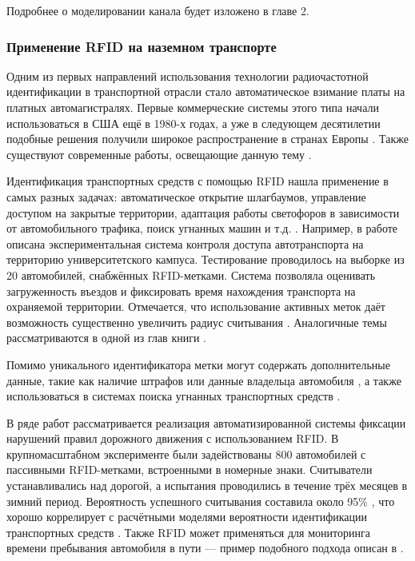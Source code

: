 \documentclass[12pt]{article}
\theoremstyle{definition}
\begin{document}
Подробнее о моделировании канала будет изложено в главе 2.

\subsubsection{Применение RFID на наземном транспорте}\label{sec:vehicles}

Одним из первых направлений использования технологии радиочастотной идентификации в транспортной отрасли стало автоматическое взимание платы на платных автомагистралях. Первые коммерческие системы этого типа начали использоваться в США ещё в 1980-х годах, а уже в следующем десятилетии подобные решения получили широкое распространение в странах Европы \cite{Blythe1999, J.2005}. Также существуют современные работы, освещающие данную тему \cite{Mazumder2025}.

Идентификация транспортных средств с помощью RFID нашла применение в самых разных задачах: автоматическое открытие шлагбаумов, управление доступом на закрытые территории, адаптация работы светофоров в зависимости от автомобильного трафика, поиск угнанных машин и т.д. \cite{Tseng2007, Bhavke2017, Rajeshwari2015, Balbin2017}. Например, в работе \cite{Pedraza2018} описана экспериментальная система контроля доступа автотранспорта на территорию университетского кампуса. Тестирование проводилось на выборке из 20 автомобилей, снабжённых RFID-метками. Система позволяла оценивать загруженность въездов и фиксировать время нахождения транспорта на охраняемой территории. Отмечается, что использование активных меток даёт возможность существенно увеличить радиус считывания \cite{Khan2011}. Аналогичные темы рассматриваются в одной из глав книги \cite{Ibrahim2025}.

Помимо уникального идентификатора метки могут содержать дополнительные данные, такие как наличие штрафов или данные владельца автомобиля \cite{MenesesGonzalez2011, Lonkar2018}, а также использоваться в системах поиска угнанных транспортных средств \cite{Balbin2017}.

В ряде работ \cite{Vishn2012, Vishn2012_3, Vishn2013} рассматривается реализация автоматизированной системы фиксации нарушений правил дорожного движения с использованием RFID. В крупномасштабном эксперименте были задействованы 800 автомобилей с пассивными RFID-метками, встроенными в номерные знаки. Считыватели устанавливались над дорогой, а испытания проводились в течение трёх месяцев в зимний период. Вероятность успешного считывания составила около 95\% \cite{Vishn2017}, что хорошо коррелирует с расчётными моделями вероятности идентификации транспортных средств \cite{Larionov2018, Vishn2023, Larionov2017, Jo2009}. Также RFID может применяться для мониторинга времени пребывания автомобиля в пути — пример подобного подхода описан в \cite{Gu2021}.
\end{document}
